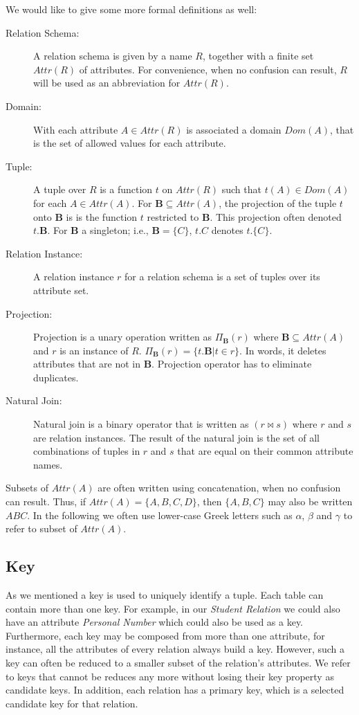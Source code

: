 We would like to give some more formal definitions as well:
\begin{description}
  \item[Relation Schema:] A relation schema is given by a name $R$, together with a finite set
    $Attr(R)$ of attributes. For convenience, when no confusion can result, $R$ will be used as an
    abbreviation for $Attr(R)$.
  \item[Domain:] With each attribute $A \in Attr(R)$ is associated a domain $Dom(A)$, that is
    the set of allowed values for each attribute. 
  \item[Tuple:] A tuple over $R$ is a function $t$ on $Attr(R)$ such that $t(A) \in Dom(A)$
    for each $A \in Attr(A)$. For $\mathbf{B} \subseteq Attr(A)$, the projection of the tuple $t$
    onto $\mathbf{B}$ is is the function $t$ restricted to $\mathbf{B}$.  This
    projection often denoted $t.\mathbf{B}$.  For $\mathbf{B}$ a singleton;
    i.e., $\mathbf{B}=\{C\}$, $t.C$ denotes $t.\{C\}$.
  \item[Relation Instance:] A relation instance $r$ for a relation schema is a set
    of tuples over its attribute set.
  \item[Projection:] Projection is a unary operation written as $\Pi_{\mathbf{B}} (r)$ 
    where $\mathbf{B} \subseteq Attr(A)$  and $r$ is an instance of $R$. 
    $\Pi_{\mathbf{B}} (r) = \{t.\mathbf{B} | t \in r\}$. In words, it deletes attributes that are not in $\mathbf{B}$. 
    Projection operator has to eliminate duplicates.
  \item[Natural Join:] Natural join is a binary operator that is written as $(r \Join s)$ where $r$ and $s$ are relation instances. 
    The result of the natural join is the set of all combinations of tuples in $r$ and $s$ that are equal on their common attribute names.
\end{description}

Subsets of $Attr(A)$ are often written using concatenation, when no
confusion can result.  Thus, if $Attr(A) = \{A,B,C,D\}$, then $\{A,B,C\}$ may
also be written $ABC$. In the following we often use lower-case Greek letters such as
$\alpha$, $\beta$ and $\gamma$ to refer to subset of $Attr(A)$.

\subsection{Key}
As we mentioned a key is used to uniquely identify a tuple. Each table can contain
more than one key. For example,
in our \textit{Student Relation} we could also have an attribute \textit{Personal Number} 
which could also be used
as a key. Furthermore, each key may be composed from more than one attribute, for instance, 
all the attributes of every relation always build a key. However, such a key can often be reduced
to a smaller subset of the relation's attributes. 
We refer to keys that cannot be reduces any more without losing their key property as candidate keys.
In addition, each relation has a primary key, which is a selected candidate key for that relation.

